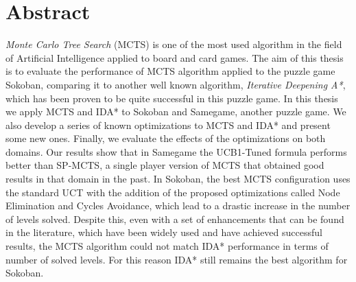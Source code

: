 \newpage
\chapter*{Abstract}
\textit{Monte Carlo Tree Search} (MCTS) is one of the most used algorithm in the field of Artificial Intelligence applied to board and card games.
The aim of this thesis is to evaluate the performance of MCTS algorithm applied to the puzzle game Sokoban, comparing it to another well known algorithm, \textit{Iterative Deepening A*}, which has been proven to be quite successful in this puzzle game.
In this thesis we apply MCTS and IDA* to Sokoban and Samegame, another puzzle game. We also develop a series of known optimizations to MCTS and IDA* and present some new ones. Finally, we evaluate the effects of the optimizations on both domains. Our results show that in Samegame the UCB1-Tuned formula performs better than SP-MCTS, a single player version of MCTS that obtained good results in that domain in the past. In Sokoban, the best MCTS configuration uses the standard UCT with the addition of the proposed optimizations called Node Elimination and Cycles Avoidance, which lead to a drastic increase in the number of levels solved. Despite this, even with a set of enhancements that can be found in the literature, which have been widely used and have achieved successful results, the MCTS algorithm could not match IDA* performance in terms of number of solved levels. For this reason IDA* still remains the best algorithm for Sokoban.